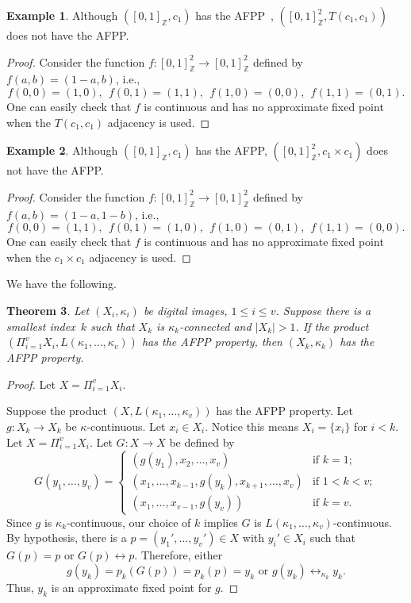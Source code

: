 \documentclass{article}
\theoremstyle{plain}
\newtheorem{thm}{Theorem}
\theoremstyle{definition}
\newtheorem{exl}[thm]{Example}
\numberwithin{thm}{section}
\newcommand{\adj}{\leftrightarrow}
\def\Z{{\mathbb Z}}
\begin{document}
\begin{exl} Although $([0,1]_{\Z},c_1)$ has the AFPP~\cite{Rosenfeld}, $([0,1]_{\Z}^2,T(c_1,c_1))$ does not have
the AFPP.
\end{exl}

\begin{proof}
Consider the function $f: [0,1]_{\Z}^2 \to [0,1]_{\Z}^2$ defined by
$f(a,b)=(1-a,b)$, i.e.,
\[f(0,0)=(1,0),~~f(0,1)=(1,1),~~f(1,0)=(0,0),~~f(1,1)=(0,1).\]
One can easily check that $f$ is continuous and has no approximate fixed
point when the $T(c_1,c_1)$ adjacency is used.
\end{proof}

\begin{exl} Although $([0,1]_{\Z},c_1)$ has the AFPP, $([0,1]_{\Z}^2,c_1 \times c_1)$ does not have the AFPP.
\end{exl}

\begin{proof}
Consider the function $f: [0,1]_{\Z}^2 \to [0,1]_{\Z}^2$ defined by
$f(a,b)=(1-a,1-b)$, i.e.,
\[f(0,0)=(1,1),~~f(0,1)=(1,0),~~f(1,0)=(0,1),~~f(1,1)=(0,0).\]
One can easily check that $f$ is continuous and has no approximate fixed
point when the $c_1 \times c_1$ adjacency is used.
\end{proof}

We have the following.

\begin{thm}
\label{L-AFPP}
Let $(X_i,\kappa_i)$ be digital images,
$1 \le i \le v$. Suppose there is a smallest
index~$k$ such that $X_k$ is $\kappa_k$-connected and $|X_k|>1$. If 
the product $(\Pi_{i=1}^v X_i, L(\kappa_1,\ldots,\kappa_v))$ has the AFPP property, then $(X_k,\kappa_k)$ has the AFPP property.
\end{thm}

\begin{proof}
Let $X=\Pi_{i=1}^v X_i$.

Suppose the product $(X, L(\kappa_1,\ldots,\kappa_v))$ has the AFPP property.
Let $g: X_k \to X_k$ be $\kappa$-continuous. Let $x_i \in X_i$.
Notice this means $X_i=\{x_i\}$ for $i < k$.
Let $X = \Pi_{i=1}^v X_i$.
Let $G: X \to X$ be defined by
\[ G(y_1,\ldots,y_v)= \left \{ \begin{array}{ll}
(g(y_1),x_2,\ldots,x_v) & \mbox{if } k=1; \\
(x_1, \ldots, x_{k-1},g(y_k),x_{k+1},\ldots,x_v) & \mbox{if } 1 < k < v; \\
(x_1, \ldots, x_{v-1}, g(y_v)) &\mbox{if } k=v.
\end{array} \right .
\]
Since $g$ is $\kappa_k$-continuous,
our choice of $k$ implies
$G$ is $L(\kappa_1,\ldots,\kappa_v)$-continuous. By hypothesis,
there is a $p=(y_1',\ldots,y_v') \in X$
with $y_i' \in X_i$ such that
$G(p)=p$ or $G(p) \adj p$. Therefore,
either
\[ g(y_k)=p_k(G(p))=p_k(p)=y_k \mbox{ or }
g(y_k) \adj_{\kappa_k} y_k. \]
Thus, $y_k$ is an approximate fixed point for $g$.
\end{proof}
\end{document}
